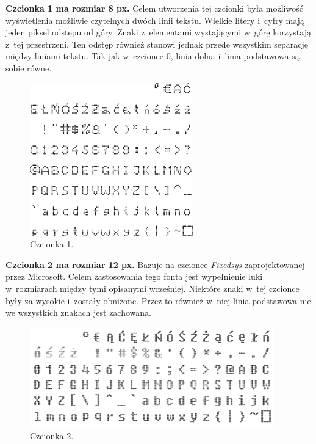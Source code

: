 \textbf{Czcionka 1 ma rozmiar 8 px.} Celem utworzenia tej czcionki była możliwość wyświetlenia możliwie czytelnych dwóch linii tekstu. Wielkie litery i~cyfry mają jeden piksel odstępu od góry. Znaki z~elementami wystającymi w~górę korzystają z~tej przestrzeni. Ten odstęp również stanowi jednak przede wszystkim separację między liniami tekstu. Tak jak w~czcionce 0, linia dolna i~linia podstawowa są sobie równe.
\begin{figure}[htb]
	\begin{center}
		\includegraphics[width=200pt]{figures/czcionka1-praca.png}
	\end{center}
	\caption{Czcionka 1.}
\end{figure}

\textbf{Czcionka 2 ma rozmiar 12 px.} Bazuje na czcionce \textit{Fixedsys} zaprojektowanej przez Microsoft. Celem zastosowania tego fonta jest wypełnienie luki w~rozmiarach między tymi opisanymi wcześniej. Niektóre znaki w~tej czcionce były za wysokie i~zostały obniżone. Przez to również w~niej linia podstawowa nie we wszystkich znakach jest zachowana.
\begin{figure}[htb]
	\begin{center}
		\includegraphics[width=300pt]{figures/czcionka2-praca.png}
	\end{center}
	\caption{Czcionka 2.}
\end{figure}

\newpage

